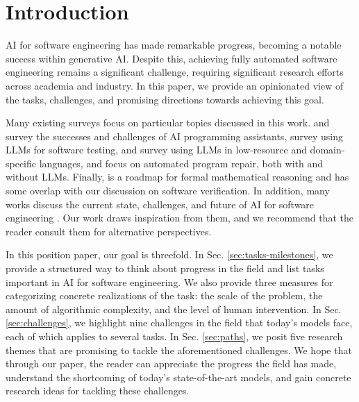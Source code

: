 \vspace{-0.2cm}

\section{Introduction}

AI for software engineering has made remarkable progress, becoming a notable success within generative AI. Despite this, achieving fully automated software engineering remains a significant challenge, requiring significant research efforts across academia and industry. In this paper, we provide an opinionated view of the tasks, challenges, and promising directions towards achieving this goal.

Many existing surveys focus on particular topics discussed in this work. \citet{liang2024large} and \citet{sergeyuk2025using} survey the successes and challenges of AI programming assistants, \citep{wang2024software} survey using LLMs for software testing, and \citet{joel2024survey} survey using LLMs in low-resource and domain-specific languages, and \citet{zhang2023survey} focus on automated program repair, both with and without LLMs. Finally, \citet{yang2024formal} is a roadmap for formal mathematical reasoning and has some overlap with our discussion on software verification. In addition, many works discuss the current state, challenges, and future of AI for software engineering \citep{fan2023large, ozkaya2023application, wong2023natural, zheng2023survey, hou2024large, jin2024llms, wan2024deep}. Our work draws inspiration from them, and we recommend that the reader consult them for alternative perspectives. 

In this position paper, our goal is threefold. In Sec. \ref{sec:tasks-milestones}, we provide a structured way to think about progress in the field and list tasks important in AI for software engineering. We also provide three measures for categorizing concrete realizations of the task: the scale of the problem, the amount of algorithmic complexity, and the level of human intervention.  In Sec. \ref{sec:challenges}, we highlight nine challenges in the field that today's models face, each of which applies to several tasks. In Sec. \ref{sec:paths}, we posit five research themes that are promising to tackle the aforementioned challenges. We hope that through our paper, the reader can appreciate the progress the field has made, understand the shortcoming of today's state-of-the-art models, and gain concrete research ideas for tackling these challenges.


